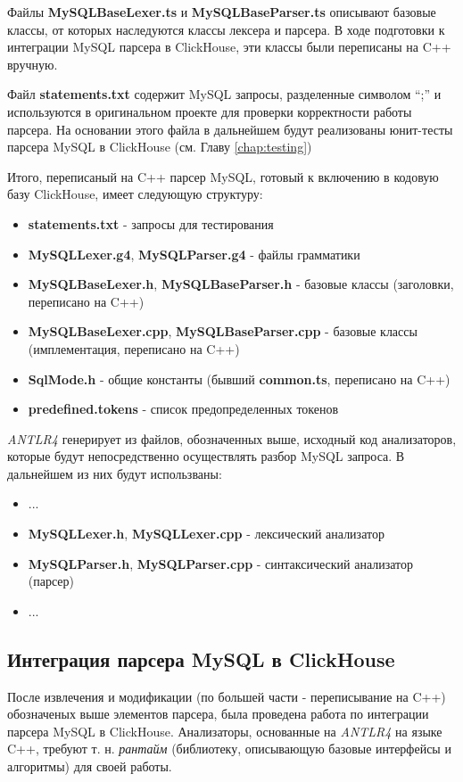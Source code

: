 Файлы \textbf{MySQLBaseLexer.ts} и \textbf{MySQLBaseParser.ts} описывают базовые классы, от которых наследуются классы лексера и парсера. В ходе подготовки к интеграции MySQL парсера в ClickHouse, эти классы были переписаны на C++ вручную. 

Файл \textbf{statements.txt} содержит MySQL запросы, разделенные символом \enquote{;} и используются в оригинальном проекте для проверки корректности работы парсера. На основании этого файла в дальнейшем будут реализованы юнит-тесты парсера MySQL в ClickHouse (см. Главу \ref{chap:testing})

Итого, переписаный на C++ парсер MySQL, готовый к включению в кодовую базу ClickHouse, имеет следующую структуру:
\begin{itemize}
    \item \textbf{statements.txt} - запросы для тестирования
    \item \textbf{MySQLLexer.g4}, \textbf{MySQLParser.g4} - файлы грамматики
    \item \textbf{MySQLBaseLexer.h}, \textbf{MySQLBaseParser.h} - базовые классы (заголовки, переписано на C++)
    \item \textbf{MySQLBaseLexer.cpp}, \textbf{MySQLBaseParser.cpp} - базовые классы (имплементация, переписано на C++)
    \item \textbf{SqlMode.h} - общие константы (бывший \textbf{common.ts}, переписано на C++)
    \item \textbf{predefined.tokens} - список предопределенных токенов
\end{itemize}

\pagebreak

\textit{ANTLR4} генерирует из файлов, обозначенных выше, исходный код анализаторов, которые будут непосредственно осуществлять разбор MySQL запроса. В дальнейшем из них будут использваны:

\begin{itemize}
    \item ...
    \item \textbf{MySQLLexer.h}, \textbf{MySQLLexer.cpp} - лексический анализатор
    \item \textbf{MySQLParser.h}, \textbf{MySQLParser.cpp} - синтаксический анализатор (парсер)
    \item ...
\end{itemize}

\subsection{Интеграция парсера MySQL в ClickHouse}
После извлечения и модификации (по большей части - переписывание на C++) обозначеных выше элементов парсера, была проведена работа по интеграции парсера MySQL в ClickHouse. Анализаторы, основанные на \textit{ANTLR4} на языке C++, требуют т. н. \textit{рантайм} (библиотеку, описывающую базовые интерфейсы и алгоритмы) для своей работы. 

